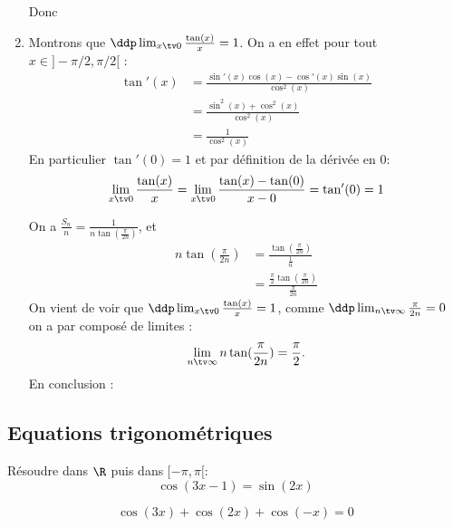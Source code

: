 \begin{correction}
\begin{enumerate}
Donc 
\begin{center}
\end{center}

\item Montrons que $\ddp\lim_{x\tv 0} \frac{\tan(x)}{x}=1$. 
On a en effet pour tout $x\in ]-\pi/2, \pi/2[$  :
\begin{align*}
\tan'(x) &=\frac{\sin'(x)\cos(x)-\cos'(x)\sin(x)}{\cos^2(x)}\\
			&=\frac{\sin^2(x)+\cos^2(x)}{\cos^2(x)}\\
			&=\frac{1}{\cos^2(x)}			
\end{align*}
En particulier $\tan'(0)=1$ et par définition  de la dérivée en $0$: 
$$\lim_{x\tv 0} \frac{\tan(x)}{x}=\lim_{x\tv 0} \frac{\tan(x)-\tan(0)}{x-0}=\tan'(0)=1$$

On a  $\frac{S_n}{n}= \frac{1}{n \tan(\frac{\pi}{2n})}$, et 
\begin{align*}
n \tan(\frac{\pi}{2n}) &= \frac{ \tan(\frac{\pi}{2n}) }{\frac{1}{n}}\\
								&= \frac{ \frac{\pi}{2}\tan(\frac{\pi}{2n}) }{\frac{\pi}{2n}}
\end{align*}
On vient de voir que $\ddp\lim_{x\tv 0} \frac{\tan(x)}{x}=1$, comme $\ddp \lim_{n\tv \infty} \frac{\pi}{2n}=0$ on a par composé de limites : 
$$\lim_{n\tv \infty} n \tan(\frac{\pi}{2n})  =\frac{\pi}{2}.$$
En conclusion : 
\begin{center}
\end{center}
\end{enumerate}
\end{correction}




\subsection{Equations trigonométriques}


\begin{exercice}
Résoudre dans $\R$ puis dans $[-\pi, \pi[$:
\begin{equation}
\cos(3x-1)=\sin(2x)
\end{equation}


\begin{equation}
\cos(3x)+\cos(2x)+\cos(-x)=0
\end{equation}
\end{exercice}

